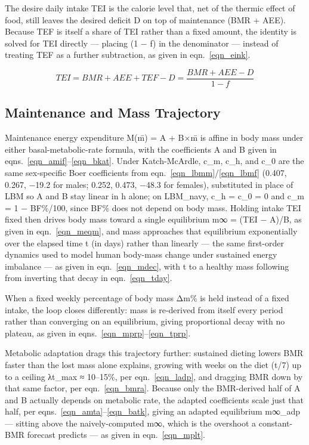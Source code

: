 The desire daily intake TEI is the calorie level that, net of the thermic effect of food, still leaves the desired deficit D on top of maintenance (BMR + AEE). Because TEF is itself a share of TEI rather than a fixed amount, the identity is solved for TEI directly — placing (1 − f) in the denominator — instead of treating TEF as a further subtraction, as given in eqn.~\eqref{eqn_eink}.

\begin{equation}
\label{eqn_eink}
TEI = BMR + AEE + TEF − D = \frac{BMR + AEE − D}{1 − f}
\end{equation}

\subsection{Maintenance and Mass Trajectory}

Maintenance energy expenditure M(m̄) = A + B×m̄ is affine in body mass under either basal-metabolic-rate formula, with the coefficients A and B given in eqns.~\eqref{eqn_amif}–\eqref{eqn_bkat}. Under Katch-McArdle, c\_m, c\_h, and c\_0 are the same sex-specific Boer coefficients from eqn.~\eqref{eqn_lbmm}/\eqref{eqn_lbmf} (0.407, 0.267, −19.2 for males; 0.252, 0.473, −48.3 for females), substituted in place of LBM so A and B stay linear in h alone; on LBM\_navy, c\_h = c\_0 = 0 and c\_m = 1 − BF\%/100, since BF\% does not depend on body mass. Holding intake TEI fixed then drives body mass toward a single equilibrium m∞ = (TEI − A)/B, as given in eqn.~\eqref{eqn_meqm}, and mass approaches that equilibrium exponentially over the elapsed time t (in days) rather than linearly — the same first-order dynamics used to model human body-mass change under sustained energy imbalance \cite{ref_chow2008} — as given in eqn.~\eqref{eqn_mdec}, with t to a healthy mass following from inverting that decay in eqn.~\eqref{eqn_tday}.

When a fixed weekly percentage of body mass Δm\% is held instead of a fixed intake, the loop closes differently: mass is re-derived from itself every period rather than converging on an equilibrium, giving proportional decay with no plateau, as given in eqns.~\eqref{eqn_mprp}–\eqref{eqn_tprp}.

Metabolic adaptation drags this trajectory further: sustained dieting lowers BMR faster than the lost mass alone explains, growing with weeks on the diet (t/7) up to a ceiling λt\_max ≈ 10–15\%, per eqn.~\eqref{eqn_ladp}, and dragging BMR down by that same factor, per eqn.~\eqref{eqn_bmra}. Because only the BMR-derived half of A and B actually depends on metabolic rate, the adapted coefficients scale just that half, per eqns.~\eqref{eqn_amta}–\eqref{eqn_batk}, giving an adapted equilibrium m∞\_adp — sitting above the naively-computed m∞, which is the overshoot a constant-BMR forecast predicts — as given in eqn.~\eqref{eqn_mplt}.

